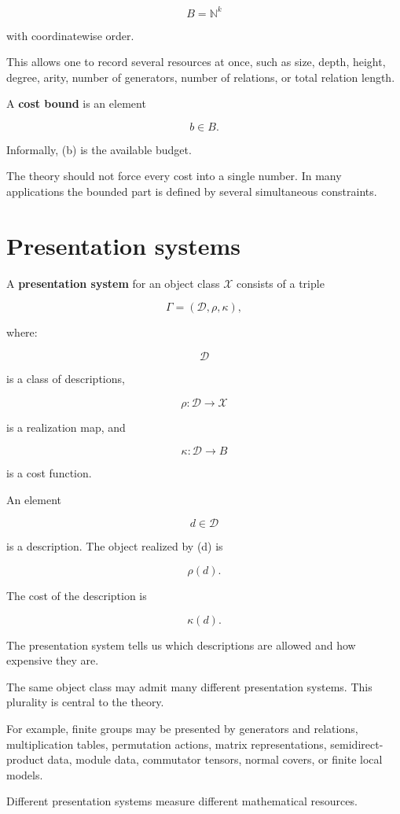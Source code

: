 \documentclass[11pt]{article}
\begin{document}
\[
B=\mathbb N^k
\]

with coordinatewise order.

This allows one to record several resources at once, such as size, depth, height, degree, arity, number of generators, number of relations, or total relation length.

A \textbf{cost bound} is an element

\[
b\in B.
\]

Informally, (b) is the available budget.

The theory should not force every cost into a single number. In many applications the bounded part is defined by several simultaneous constraints.


\section{Presentation systems}

A \textbf{presentation system} for an object class \(\mathcal X\) consists of a triple

\[
\Gamma=(\mathcal D,\rho,\kappa),
\]

where:

\[
\mathcal D
\]

is a class of descriptions,

\[
\rho:\mathcal D\to \mathcal X
\]

is a realization map, and

\[
\kappa:\mathcal D\to B
\]

is a cost function.

An element

\[
d\in\mathcal D
\]

is a description. The object realized by (d) is

\[
\rho(d).
\]

The cost of the description is

\[
\kappa(d).
\]

The presentation system tells us which descriptions are allowed and how expensive they are.

The same object class may admit many different presentation systems. This plurality is central to the theory.

For example, finite groups may be presented by generators and relations, multiplication tables, permutation actions, matrix representations, semidirect-product data, module data, commutator tensors, normal covers, or finite local models.

Different presentation systems measure different mathematical resources.
\end{document}
